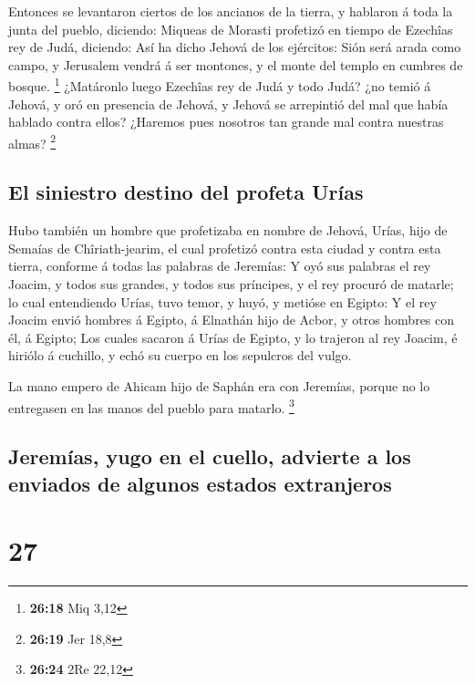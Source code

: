  Entonces se levantaron ciertos de los ancianos de la
tierra, y hablaron á toda la junta del pueblo, diciendo: 
Miqueas de Morasti profetizó en tiempo de Ezechîas rey de Judá,
diciendo: Así ha dicho Jehová de los ejércitos: Sión será arada como
campo, y Jerusalem vendrá á ser montones, y el monte del templo en
cumbres de bosque. \footnote{\textbf{26:18} Miq 3,12} 
¿Matáronlo luego Ezechîas rey de Judá y todo Judá? ¿no temió á Jehová, y
oró en presencia de Jehová, y Jehová se arrepintió del mal que había
hablado contra ellos? ¿Haremos pues nosotros tan grande mal contra
nuestras almas? \footnote{\textbf{26:19} Jer 18,8}

\hypertarget{el-siniestro-destino-del-profeta-uruxedas}{%
\subsection{El siniestro destino del profeta
Urías}\label{el-siniestro-destino-del-profeta-uruxedas}}

 Hubo también un hombre que profetizaba en nombre de
Jehová, Urías, hijo de Semaías de Chîriath-jearim, el cual profetizó
contra esta ciudad y contra esta tierra, conforme á todas las palabras
de Jeremías:  Y oyó sus palabras el rey Joacim, y todos
sus grandes, y todos sus príncipes, y el rey procuró de matarle; lo cual
entendiendo Urías, tuvo temor, y huyó, y metióse en Egipto:
 Y el rey Joacim envió hombres á Egipto, á Elnathán hijo
de Acbor, y otros hombres con él, á Egipto;  Los cuales
sacaron á Urías de Egipto, y lo trajeron al rey Joacim, é hiriólo á
cuchillo, y echó su cuerpo en los sepulcros del vulgo.

 La mano empero de Ahicam hijo de Saphán era con
Jeremías, porque no lo entregasen en las manos del pueblo para matarlo.
\footnote{\textbf{26:24} 2Re 22,12}

\hypertarget{jeremuxedas-yugo-en-el-cuello-advierte-a-los-enviados-de-algunos-estados-extranjeros}{%
\subsection{Jeremías, yugo en el cuello, advierte a los enviados de
algunos estados
extranjeros}\label{jeremuxedas-yugo-en-el-cuello-advierte-a-los-enviados-de-algunos-estados-extranjeros}}

\hypertarget{section-26}{%
\section{27}\label{section-26}}

